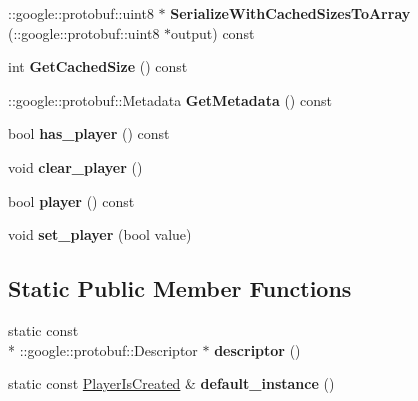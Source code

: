 \begin{DoxyCompactItemize}
\item 
\hypertarget{class_player_is_created_a13b3f9d7a0b84e04ce730fcf54ba6603}{\-::google\-::protobuf\-::uint8 $\ast$ {\bfseries Serialize\-With\-Cached\-Sizes\-To\-Array} (\-::google\-::protobuf\-::uint8 $\ast$output) const }\label{class_player_is_created_a13b3f9d7a0b84e04ce730fcf54ba6603}

\item 
\hypertarget{class_player_is_created_a6d8061fd2cb9f20a7da3496871a54bf1}{int {\bfseries Get\-Cached\-Size} () const }\label{class_player_is_created_a6d8061fd2cb9f20a7da3496871a54bf1}

\item 
\hypertarget{class_player_is_created_adbfbc228667ab0a18842e0957557a35e}{\-::google\-::protobuf\-::\-Metadata {\bfseries Get\-Metadata} () const }\label{class_player_is_created_adbfbc228667ab0a18842e0957557a35e}

\item 
\hypertarget{class_player_is_created_ae6153984b0901ab6cd1ddce575fc4d46}{bool {\bfseries has\-\_\-player} () const }\label{class_player_is_created_ae6153984b0901ab6cd1ddce575fc4d46}

\item 
\hypertarget{class_player_is_created_a519e740c8a32d1d12a055656b343cbe2}{void {\bfseries clear\-\_\-player} ()}\label{class_player_is_created_a519e740c8a32d1d12a055656b343cbe2}

\item 
\hypertarget{class_player_is_created_af2c5f8ac5a26a1ee7a0188db7e40353c}{bool {\bfseries player} () const }\label{class_player_is_created_af2c5f8ac5a26a1ee7a0188db7e40353c}

\item 
\hypertarget{class_player_is_created_a733f2e902a0ceba19444f5674cc43298}{void {\bfseries set\-\_\-player} (bool value)}\label{class_player_is_created_a733f2e902a0ceba19444f5674cc43298}

\end{DoxyCompactItemize}
\subsection*{Static Public Member Functions}
\begin{DoxyCompactItemize}
\item 
\hypertarget{class_player_is_created_a1593f54d4c123114c10177b7cac778d0}{static const \\*
\-::google\-::protobuf\-::\-Descriptor $\ast$ {\bfseries descriptor} ()}\label{class_player_is_created_a1593f54d4c123114c10177b7cac778d0}

\item 
\hypertarget{class_player_is_created_ad4a6beb4d9c38cad9a89e77dd81e1f75}{static const \hyperlink{class_player_is_created}{Player\-Is\-Created} \& {\bfseries default\-\_\-instance} ()}\label{class_player_is_created_ad4a6beb4d9c38cad9a89e77dd81e1f75}

\end{DoxyCompactItemize}
